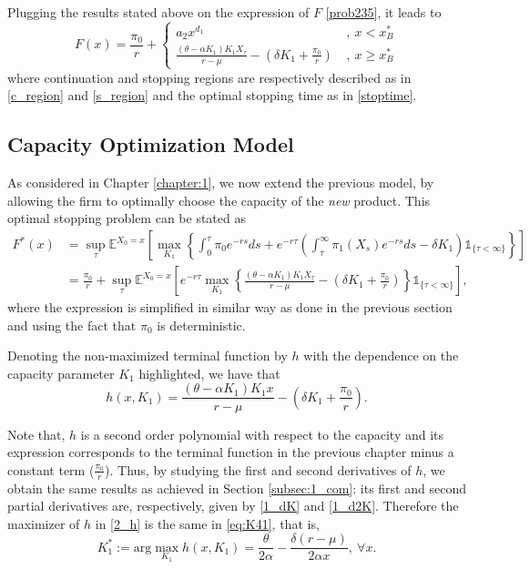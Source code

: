 Plugging the results stated above on the expression of $F$ \eqref{prob235}, it leads to
\begin{equation}
F(x)=\frac{\pi_0}{r}+\begin{cases} a_2 x^{d_1} &\ , \ x<x^*_B \\
\frac{(\theta-\alpha K_1)K_1 X_\tau}{r-\mu} - \left( \delta K_1  +\frac{\pi_0}{r}\right) &\ , \ x\geq x_B^*
\label{2:Fbm}
\end{cases}
\end{equation}
where continuation and stopping regions are respectively described as in \eqref{c_region} and \eqref{s_region} and the optimal stopping time as in \eqref{stoptime}.




\subsection{Capacity Optimization Model}
\label{subsec:2_com}

As considered in Chapter \ref{chapter:1}, we now extend the previous model, by allowing the firm to optimally choose the capacity of the \textit{new} product.
This optimal stopping problem can be stated as
\begin{align}
F^*(x)&=\sup _\tau \mathds{E}^{X_0=x} \left[ \max_{K_1} \left\{ \int_0^\tau \pi_0e^{-rs} ds + e^{-r\tau} \left( \int_\tau^\infty \pi_1(X_s)e^{-rs}ds -\delta K_1 \right) \mathds{1}_{ \{\tau < \infty \} } \right\} \right] \nonumber \\
&= \frac{\pi_0}{r}+ \sup _\tau \mathds{E}^{X_0=x} \left[ e^{-r\tau} \max_{K_1}   \left\{ \frac{(\theta-\alpha K_1)K_1X_\tau}{r-\mu} - \left( \delta K_1  +\frac{\pi_0}{r}\right)   \right\} \mathds{1}_{ \{\tau < \infty \} } \right],
\label{eq:o2}
\end{align}
where the expression is simplified in similar way as done in the previous section and using the fact that $\pi_0$ is deterministic.

Denoting the non-maximized terminal function by $h$ with the dependence on the capacity parameter $K_1$ highlighted, we have that
\begin{equation}
h(x,K_1)= \frac{(\theta-\alpha K_1)K_1 x}{r-\mu} - \left( \delta K_1  +\frac{\pi_0}{r}\right).
\label{2_h}
\end{equation}

Note that, $h$ is a second order polynomial with respect to the capacity and its expression corresponds to the terminal function in the previous chapter minus a constant term ($\frac{\pi_0}{r}$). Thus, by studying the first and second derivatives of $h$, we obtain the same results as achieved in Section \ref{subsec:1_com}: its first and second partial derivatives are, respectively, given by \eqref{1_dK} and \eqref{1_d2K}. Therefore the maximizer of $h$ in \eqref{2_h} is the same in \eqref{eq:K41}, that is,
\begin{equation}
K^*_1:=\text{arg} \max_{K_1} h(x,K_1) = \frac{\theta}{2\alpha}-\frac{\delta (r-\mu)}{2 \alpha x}, \ \forall x.
\label{eq:Kopt2}
\end{equation}

